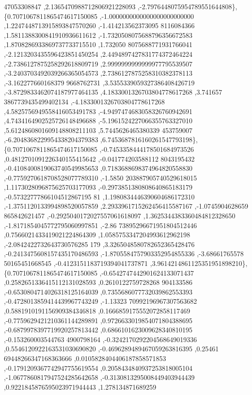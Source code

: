 \begin{DoxyCode}
      47053308847 ,2.1365470988712806921228093 ,-2.7976448075954789551644808\},
\{0.7071067811865474617150085 ,-1.0000000000000000000000000 ,1.2247448713915893847570260 ,-1.414213562373095
      8116084366 ,1.5811388300841910936611612 ,-1.7320508075688796356672583 ,1.8708286933869737733715510 ,1.732050
      8075688771931766041 ,-2.1213203435596423851450254 ,2.4494897427831774372464224 ,-2.7386127875258292618809719
       ,2.9999999999999977795539507 ,-3.2403703492039266365054573 ,2.7386127875258310382378113 ,-3.162277660168379
      9668762731 ,3.5355339059327386408426719 ,-3.8729833462074187977464135 ,4.1833001326703804778617268 ,3.741657
      3867739435499402134 ,-4.1833001326703804778617268 ,4.5825756949558416053491783 ,-4.9497474683058326760942691
       ,4.7434164902525726148496688 ,-5.1961524227066355763327010 ,5.6124860801609148808211103 ,5.7445626465380339
      453759007 ,-6.2048368229954338204379383 ,6.7453687816160261547793198\},
\{0.7071067811865474617150085 ,-0.7453358444178501684973526 ,0.4812701091226340155415642 ,-0.041774203588112
      8043195432 ,-0.4108400819063740549985653 ,0.7183688698374964820558830 ,-0.7759270618708528077789310 ,-1.5850
      203887905740529618015 ,1.1173028096875625703177093 ,-0.2973851380808640865183179 ,-0.57322777866104512867195
      81 ,1.1980834446390604686172310 ,-1.3751120133994898520057859 ,2.2933961715262456415587167 ,-1.0745904628659
      865842621457 ,-0.2925040172027557061618097 ,1.3625344383360484812328650 ,-1.8171854045772795060997851 ,-2.86
      73895296671951804512446 ,0.7566021433419021224864309 ,1.0585753347204993612962198 ,-2.0842422732643730576285
      179 ,3.3265048580782652365428476 ,-0.2413475608157435170486593 ,-1.8705584757903352954855336 ,-3.68661765578
      50165451668545 ,-0.4123151183719394041737871 ,3.9614214861125351951898210\},
\{0.7071067811865474617150085 ,-0.6542747442901624133071437 ,0.2582651336415112131028593 ,0.2610122759728268
      904133586 ,-0.6530804714026318125164039 ,0.7355686077732039862553393 ,-0.4728013859414439967743249 ,-1.13323
      70992196967307563682 ,0.5881910191156909384346818 ,0.1666859175552072858117469 ,-0.7759629421210361144289891
       ,0.9726633019854071804388695 ,-0.6879978397719920257813442 ,0.6866101623009628340810195 ,-0.153260003544763
      4900798164 ,-0.3242170292204568649019336 ,0.5546120922163531030690820 ,-0.4696289489467059263816395 ,0.25461
      69448266347168363666 ,0.0105828404406187858571853 ,-0.1791209367742947755619554 ,0.2058434840937253818005104
       ,-1.0677860817947524285642658 ,-0.3130813295008449403944439 ,0.9221845876595023971944443 ,1.278134871689259

\end{DoxyCode}
